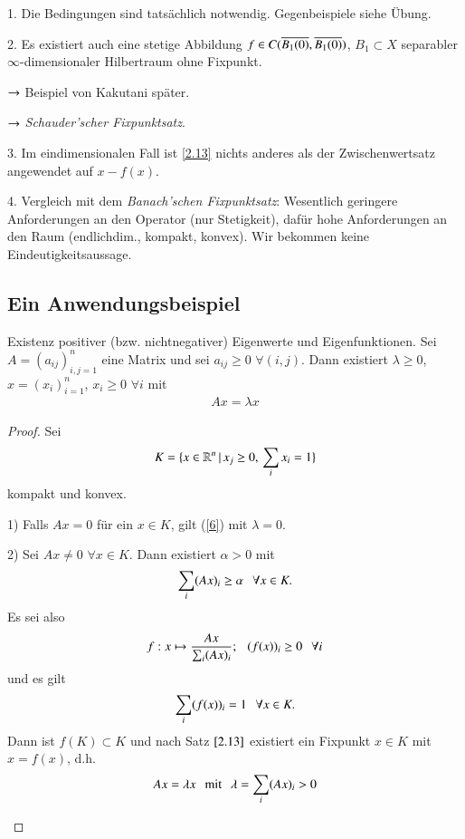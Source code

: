 \begin{remark}
    \begin{description}
    \item{1.}
    Die Bedingungen sind tatsächlich notwendig. Gegenbeispiele siehe Übung.
    \item{2.}
    Es existiert auch eine stetige Abbildung $f\in C(\overline{B_1(0)},\overline{B_1(0)})$, $B_1\subset X$ separabler
    $\infty$-dimensionaler Hilbertraum ohne Fixpunkt.
    \begin{description}
    \item{$\rightarrow$}
    Beispiel von Kakutani später.
    \item{$\rightarrow$}
    \textit{Schauder'scher Fixpunktsatz}.
    \end{description}
    \item{3.}
    Im eindimensionalen Fall ist \ref{2.13} nichts anderes als der Zwischenwertsatz angewendet auf
    $x-f(x)$.
    \item{4.}
    Vergleich mit dem \textit{Banach'schen Fixpunktsatz}: Wesentlich geringere Anforderungen an den
    Operator (nur Stetigkeit), dafür hohe Anforderungen an den Raum (endlichdim., kompakt, konvex).
    Wir bekommen keine Eindeutigkeitsaussage.
    \end{description}
\end{remark}

\subsection*{Ein Anwendungsbeispiel}

Existenz positiver (bzw. nichtnegativer) Eigenwerte und Eigenfunktionen. Sei $A=(a_{ij})_{i,j=1}^n$ eine
Matrix und sei $a_{ij}\geq 0$ $\forall (i,j)$. Dann existiert $\lambda\geq 0$, $x=(x_i)_{i=1}^n$,
$x_i\geq 0$ $\forall i$ mit
\begin{align}\label{6}
    Ax=\lambda x
\end{align}

\begin{proof}
    Sei 
    \[
        K=\{ x\in \mathbb{R}^n \, |\, x_j\geq 0, \, \sum_{i}x_i=1 \}
    \]
    kompakt und konvex.
    \begin{description}
        \item{1)}
        Falls $Ax=0$ für ein $x\in K$, gilt (\ref{6}) mit $\lambda=0$.
        \item{2)}
        Sei $Ax\neq 0$ $\forall x\in K$. Dann existiert $\alpha>0$ mit
        \[
            \sum_i(Ax)_i\geq \alpha \hspace{.25cm} \forall x\in K.
        \]
        Es sei also
        \[
            f:x\mapsto \frac{Ax}{\sum_i (Ax)_i}; \hspace{.25cm} (f(x))_i \geq 0 \hspace{.25cm} \forall i
        \]
        und es gilt
        \[
            \sum_i (f(x))_i=1 \hspace{.25cm} \forall x\in K.
        \]
        Dann ist $f(K)\subset K$ und nach Satz $\ref{2.13}$ existiert ein Fixpunkt $x\in K$ mit $x=f(x)$,
        d.h.
        \[
            Ax=\lambda x \hspace{.25cm} \text{mit} \hspace{.25cm} \lambda =\sum_i(Ax)_i >0
        \]
    \end{description}\[ \]
\end{proof}

